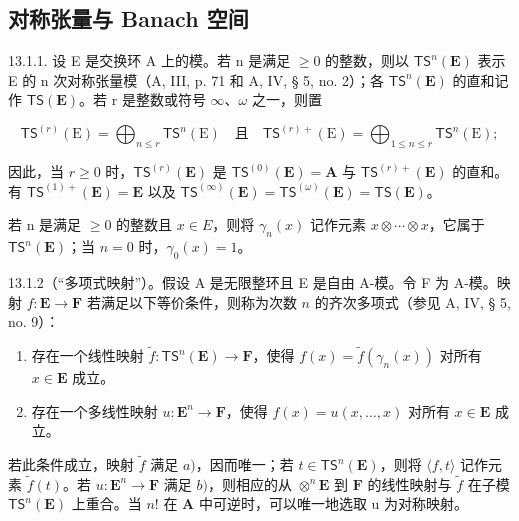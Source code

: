 \subsection{对称张量与 Banach 空间}

13.1.1. 设 E 是交换环 A 上的模。若 n 是满足 \(\geqslant0\) 的整数，则以 \(\mathsf{TS}^{n}(\mathbf{E})\) 表示 E 的 n 次对称张量模（A, III, p. 71 和 A, IV, § 5, no. 2）；各 \(\mathsf{TS}^{n}(\mathbf{E})\) 的直和记作 \(\mathsf{TS}(\mathbf{E})\)。若 r 是整数或符号 \(\infty\)、\(\omega\) 之一，则置

\[
\mathsf{TS}^{(r)}(\mathrm{E})=\bigoplus_{n\leqslant r}\mathsf{TS}^{n}(\mathrm{E})\quad\text{且}\quad\mathsf{TS}^{(r)+}(\mathrm{E})=\bigoplus_{1\leqslant n\leqslant r}\mathsf{TS}^{n}(\mathrm{E});
\]

因此，当 \(r \geqslant 0\) 时，\(\mathsf{TS}^{(r)}(\mathbf{E})\) 是 \(\mathsf{TS}^{(0)}(\mathbf{E}) = \mathbf{A}\) 与 \(\mathsf{TS}^{(r)+}(\mathbf{E})\) 的直和。有 \(\mathsf{TS}^{(1)+}(\mathbf{E}) = \mathbf{E}\) 以及 \(\mathsf{TS}^{(\infty)}(\mathbf{E}) = \mathsf{TS}^{(\omega)}(\mathbf{E}) = \mathsf{TS}(\mathbf{E})\)。

若 n 是满足 \(\geqslant0\) 的整数且 \(x\in E\)，则将 \(\gamma_{n}(x)\) 记作元素 \(x\otimes\cdots\otimes x\)，它属于 \(\mathsf{TS}^{n}(\mathbf{E})\)；当 \(n=0\) 时，\(\gamma_{0}(x)=1\)。

13.1.2（“多项式映射”）。假设 A 是无限整环且 E 是自由 A-模。令 F 为 A-模。映射 \(f\colon\mathbf{E}\to\mathbf{F}\) 若满足以下等价条件，则称为次数 \(n\) 的齐次多项式（参见 A, IV, § 5, no. 9）：

\begin{enumerate}
\def\labelenumi{\alph{enumi})}
\item
  存在一个线性映射 \(\tilde{f}\colon\mathsf{TS}^{n}(\mathbf{E})\to\mathbf{F}\)，使得 \(f(x)=\tilde{f}(\gamma_{n}(x))\) 对所有 \(x\in\mathbf{E}\) 成立。
\item
  存在一个多线性映射 \(u: \mathbf{E}^{n} \to \mathbf{F}\)，使得 \(f(x) = u(x, \ldots, x)\) 对所有 \(x \in \mathbf{E}\) 成立。
\end{enumerate}

若此条件成立，映射 \(\tilde{f}\) 满足 \(a)\)，因而唯一；若 \(t \in \mathsf{TS}^n(\mathbf{E})\)，则将 \(\langle f, t \rangle\) 记作元素 \(\tilde{f}(t)\)。若 \(u: \mathbf{E}^n \to \mathbf{F}\) 满足 \(b)\)，则相应的从 \(\otimes^n\mathbf{E}\) 到 \(\mathbf{F}\) 的线性映射与 \(\tilde{f}\) 在子模 \(\mathsf{TS}^n(\mathbf{E})\) 上重合。当 \(n!\) 在 \(\mathbf{A}\) 中可逆时，可以唯一地选取 u 为对称映射。

